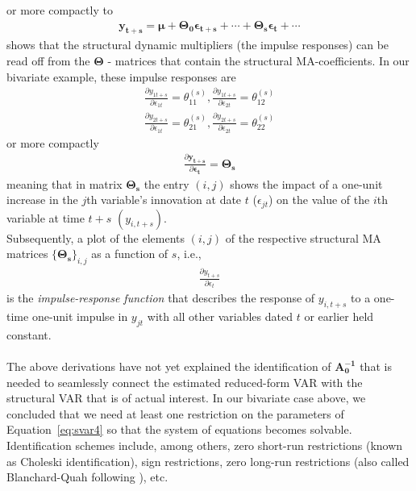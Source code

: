 \documentclass[a4paper,11pt,listof=nochaptergap,oneside,pointednumbers,bibtotoc,bigheadings,liststotoc]{scrbook}
\newcommand{\vect}[1]{\boldsymbol{\mathbf{#1}}}
\begin{document}
or more compactly to 
\begin{equation} \label{eq:svar8}
\begin{split}
 		\vect{y_{t+s}} = \vect{\mu} + \vect{\Theta_0}\vect{\epsilon_{t+s}} + \cdots + \vect{\Theta_s}\vect{\epsilon_{t}} + \cdots
\end{split}								
\end{equation}
shows that the structural dynamic multipliers (the impulse responses) can be read off from the $\vect{\Theta}$ - matrices that contain the structural MA-coefficients. In our bivariate example, these impulse responses are
\begin{equation} \label{eq:svar9}
\begin{split}
 		\frac{\partial y_{1t+s}}{\partial \epsilon_{1t}} = \theta_{11}^{(s)}, \frac{\partial y_{1t+s}}{\partial \epsilon_{2t}} = \theta_{12}^{(s)} \\
		\frac{\partial y_{2t+s}}{\partial \epsilon_{1t}} = \theta_{21}^{(s)}, \frac{\partial y_{2t+s}}{\partial \epsilon_{2t}} = \theta_{22}^{(s)}
\end{split}								
\end{equation}
or more compactly 
\begin{equation} \label{eq:svar10}
\begin{split}
 		\frac{\partial \vect{y_{t+s}}}{\partial \vect{\epsilon_{t}}} =  \vect{\Theta_s}
\end{split}								
\end{equation}
meaning that in matrix $\vect{\Theta_s}$ the entry $(i, j)$ shows the impact of a one-unit increase in the $j$th variable's innovation at date $t$ ($\epsilon_{jt}$) on the value of the $i$th variable at time $t+s$ $(y_{i, t + s})$.\\
Subsequently, a plot of the elements $(i, j)$ of the respective structural MA matrices $\{\vect{\Theta_s}\}_{i, j}$ as a function of $s$, i.e., 
\begin{equation} \label{eq:svar10}
\begin{split}
 		\frac{\partial y_{t+s}}{\partial \epsilon_{t}}
\end{split}								
\end{equation}
is the \textit{impulse-response function} that describes the response of $y_{i, t+s}$ to a one-time one-unit impulse in $y_{jt}$ with all other variables dated $t$ or earlier held constant.\\
\\
The above derivations have not yet explained the identification of $\vect{A_0^{-1}}$ that is needed to seamlessly connect the estimated reduced-form VAR with the structural VAR that is of actual interest. In our bivariate case above, we concluded that we need at least one restriction on the parameters of Equation~\ref{eq:svar4} so that the system of equations becomes solvable. Identification schemes include, among others, zero short-run restrictions (known as Choleski identification), sign restrictions, zero long-run restrictions (also called Blanchard-Quah following \citealp{blanchardandquah:89}), etc.\\
\end{document}
